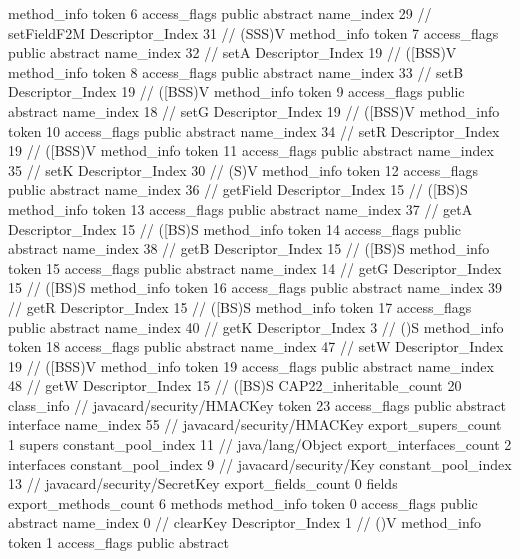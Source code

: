 {{{{{				}
				method_info {
					token	6
					access_flags	public abstract
					name_index	29		// setFieldF2M
					Descriptor_Index	31		// (SSS)V
				}
				method_info {
					token	7
					access_flags	public abstract
					name_index	32		// setA
					Descriptor_Index	19		// ([BSS)V
				}
				method_info {
					token	8
					access_flags	public abstract
					name_index	33		// setB
					Descriptor_Index	19		// ([BSS)V
				}
				method_info {
					token	9
					access_flags	public abstract
					name_index	18		// setG
					Descriptor_Index	19		// ([BSS)V
				}
				method_info {
					token	10
					access_flags	public abstract
					name_index	34		// setR
					Descriptor_Index	19		// ([BSS)V
				}
				method_info {
					token	11
					access_flags	public abstract
					name_index	35		// setK
					Descriptor_Index	30		// (S)V
				}
				method_info {
					token	12
					access_flags	public abstract
					name_index	36		// getField
					Descriptor_Index	15		// ([BS)S
				}
				method_info {
					token	13
					access_flags	public abstract
					name_index	37		// getA
					Descriptor_Index	15		// ([BS)S
				}
				method_info {
					token	14
					access_flags	public abstract
					name_index	38		// getB
					Descriptor_Index	15		// ([BS)S
				}
				method_info {
					token	15
					access_flags	public abstract
					name_index	14		// getG
					Descriptor_Index	15		// ([BS)S
				}
				method_info {
					token	16
					access_flags	public abstract
					name_index	39		// getR
					Descriptor_Index	15		// ([BS)S
				}
				method_info {
					token	17
					access_flags	public abstract
					name_index	40		// getK
					Descriptor_Index	3		// ()S
				}
				method_info {
					token	18
					access_flags	public abstract
					name_index	47		// setW
					Descriptor_Index	19		// ([BSS)V
				}
				method_info {
					token	19
					access_flags	public abstract
					name_index	48		// getW
					Descriptor_Index	15		// ([BS)S
				}
			}
			CAP22_inheritable_count	20
		}
		class_info {		// javacard/security/HMACKey
			token	23
			access_flags	public abstract interface
			name_index	55		// javacard/security/HMACKey
			export_supers_count	1
			supers {
				constant_pool_index	11		// java/lang/Object
			}
			export_interfaces_count	2
			interfaces {
				constant_pool_index	9		// javacard/security/Key
				constant_pool_index	13		// javacard/security/SecretKey
			}
			export_fields_count	0
			fields {
			}
			export_methods_count	6
			methods {
				method_info {
					token	0
					access_flags	public abstract
					name_index	0		// clearKey
					Descriptor_Index	1		// ()V
				}
				method_info {
					token	1
					access_flags	public abstract
}}}}}
